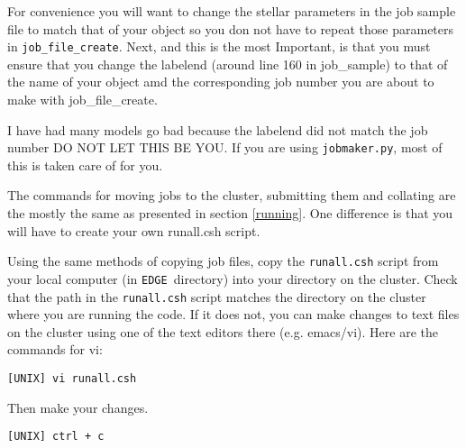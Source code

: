 \documentclass{article}
\newcommand{\edge}{\texttt{EDGE }}
\begin{document}
\vspace{2mm}
\noindent For convenience you will want to change the stellar parameters in the job sample file to match that of your object so you don not have to repeat those parameters in \texttt{job\_file\_create}. Next, and this is the most Important, is that you must ensure that you change the labelend (around line 160 in job\_sample) to that of the name of your object amd the corresponding job number you are about to make with job\_file\_create. 

\vspace{2mm}
\noindent I have had many models go bad because the labelend did not match the job number DO NOT LET THIS BE YOU. If you are using \texttt{jobmaker.py}, most of this is taken care of for you.

 

\vspace{2mm}
\noindent The commands for moving jobs to the cluster, submitting them and collating are the mostly the same as presented in section \ref{running}. One difference is that you will have to create your own runall.csh script.

\vspace{2mm}
\noindent Using the same methods of copying job files, copy the \texttt{runall.csh} script from your local computer (in \edge directory) into your directory on the cluster. Check that the path in the \texttt{runall.csh} script matches the directory on the cluster where you are running the code. If it does not, you can make changes to text files on the cluster using one of the text editors there (e.g. emacs/vi). Here are the commands for vi:

\vspace{2mm}
\texttt{[UNIX] vi runall.csh}
\vspace{2mm}

Then make your changes.

\vspace{2mm}
\texttt{[UNIX] ctrl + c}
\vspace{2mm}
\end{document}

